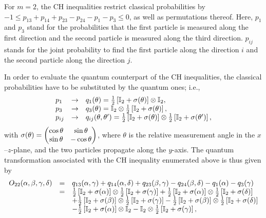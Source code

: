 \documentclass[pra,showpacs,showkeys,amsfonts,amsmath]{revtex4}
\begin{document}
For $m=2$, the CH inequalities restrict classical probabilities by
$-1 \leq p_{13} + p_{14} + p_{23} - p_{24}- p_{1} -p_{3} \leq 0$, as well as permutations thereof.
Here, $p_{1}$ and $p_{3}$ stand for the probabilities that the first particle is measured along
the first direction and the second particle is measured along the third direction.
$p_{ij}$ stands for the joint probability to find the first particle along the direction $i$
and the second particle along the direction $j$.

In order to evaluate the quantum counterpart of the CH inequalities,
the classical probabilities have to be substituted by the quantum ones;
i.e.,
\begin{equation}
\begin{array}{lll}
p_1 &\rightarrow& q_1 (\theta ) =
{\frac{1}{2}}\left[{\mathbb I}_2 + {\bf \sigma}( \theta )\right] \otimes  {\mathbb I}_2,
\\
p_3 &\rightarrow& q_3 (\theta ) =
{\mathbb I}_2 \otimes {\frac{1}{2}}\left[{\mathbb I}_2 + {\bf \sigma}( \theta )\right],
\\
p_{ij}&\rightarrow& q_{ij} (\theta ,\theta ') =
{\frac{1}{2}}\left[{\mathbb I}_2 + {\bf \sigma}( \theta )\right]
\otimes
{\frac{1}{2}}\left[{\mathbb I}_2 + {\bf \sigma}( \theta ')\right],
\end{array}
\label{2004-qbounds-e2}
\end{equation}
with
$
{\bf \sigma}( \theta )=
\begin{pmatrix} \cos \theta & \sin \theta  \\
  \sin\theta & -\cos \theta
  \end{pmatrix}
$,
where $\theta $ is the relative measurement angle in the $x$--$z$-plane, and the two particles propagate along the $y$-axis.
The quantum transformation associated with the CH inequality enumerated above is thus given by
\begin{equation}
\begin{array}{lcl}
O_{22}(\alpha,\beta,\gamma,\delta)
&=&  q_{13}(\alpha,\gamma) +
q_{14}(\alpha,\delta) + q_{23}(\beta,\gamma) - q_{24}(\beta,\delta)- q_{1}(\alpha) - q_{3}(\gamma)\\
&=&
{\frac{1}{2}}\left[{\mathbb I}_2 + {\bf \sigma}( \alpha )\right]
\otimes
{\frac{1}{2}}\left[{\mathbb I}_2 + {\bf \sigma}( \gamma )\right] +
{\frac{1}{2}}\left[{\mathbb I}_2 + {\bf \sigma}( \alpha )\right]
\otimes
{\frac{1}{2}}\left[{\mathbb I}_2 + {\bf \sigma}( \delta )\right] \\
&& +
{\frac{1}{2}}\left[{\mathbb I}_2 + {\bf \sigma}( \beta )\right]
\otimes
{\frac{1}{2}}\left[{\mathbb I}_2 + {\bf \sigma}( \gamma )\right]
- {\frac{1}{2}}\left[{\mathbb I}_2 + {\bf \sigma}( \beta)\right]
\otimes
{\frac{1}{2}}\left[{\mathbb I}_2 + {\bf \sigma}( \delta)\right]\\
&& -
{\frac{1}{2}}\left[{\mathbb I}_2 + {\bf \sigma}( \alpha )\right] \otimes  {\mathbb I}_2
- {\mathbb I}_2 \otimes {\frac{1}{2}}\left[{\mathbb I}_2 + {\bf \sigma}( \gamma )\right],
\end{array}
\label{2004-qbounds-e4}
\end{equation}
\end{document}
